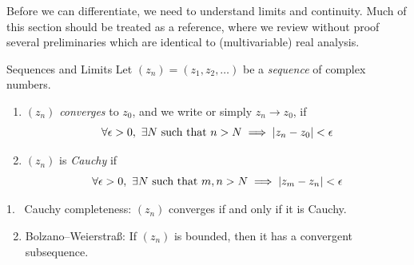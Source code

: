 Before we can differentiate, we need to understand limits and continuity. Much of this section should be treated as a reference, where we review without proof several preliminaries which are identical to (multivariable) real analysis.

\begin{defn}{Sequences and Limits}{}{}
Let $(z_n)=(z_1,z_2,\ldots)$ be a \emph{sequence} of complex numbers.
\begin{enumerate}\itemsep2pt
  \item $(z_n)$ \emph{converges} to $z_0$, and we write  or simply $z_n\to z_0$, if
	\[\forall \epsilon>0,\ \exists N\text{ such that }n>N\implies \left| z_n-z_0\right|<\epsilon\]
	
	\item $(z_n)$ is \emph{Cauchy} if
	\[\forall \epsilon>0,\ \exists N\text{ such that }m,n>N\implies \left| z_m-z_n\right|<\epsilon\]
\end{enumerate}
\end{defn}

\begin{thm}{}{}
\hangindent\leftmargini
\textup{1.} \ Cauchy completeness: $(z_n)$ converges if and only if it is Cauchy.
\begin{enumerate}\setcounter{enumi}{1}
  \item Bolzano--Weierstraß: If $(z_n)$ is bounded, then it has a convergent subsequence.
\end{enumerate}
\end{thm}

